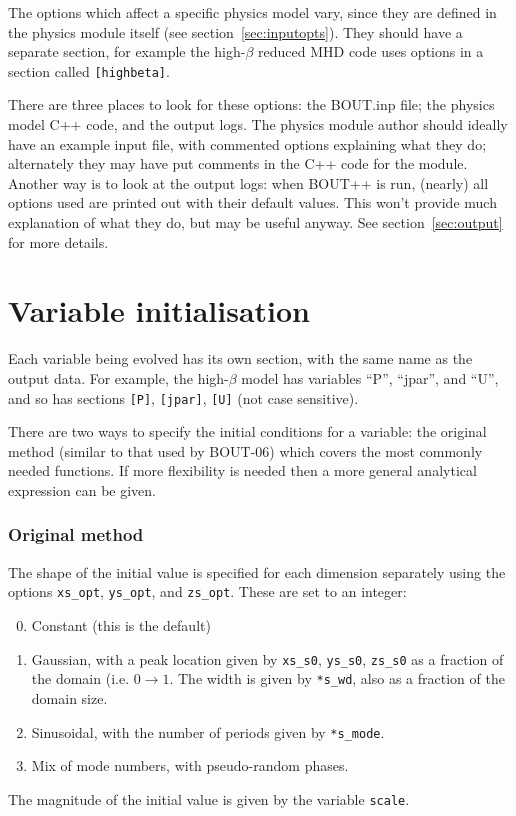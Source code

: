 \documentclass[12pt]{article}
\newcommand{\code}[1]{\texttt{#1}}
\begin{document}
The options which affect a specific physics model vary, since they are defined in the physics module itself
(see section~\ref{sec:inputopts}). They should have a separate section, for example the high-$\beta$
reduced MHD code uses options in a section called \code{[highbeta]}.

There are three places to look for these options: the BOUT.inp file; the physics model C++ code, and
the output logs. The physics module author should ideally have an example input file, with commented options
explaining what they do; alternately they may have put comments in the C++ code for the module.
Another way is to look at the output logs: when BOUT++ is run, (nearly) all options used are printed
out with their default values. This won't provide much explanation of what they do, but may be useful anyway.
See section~\ref{sec:output} for more details.

\section{Variable initialisation}
Each variable being evolved has its own section, with the same name as the
output data. For example, the high-$\beta$ model has variables ``P'',
``jpar'', and ``U'', and so has sections \code{[P]}, \code{[jpar]},
\code{[U]} (not case sensitive).

There are two ways to specify the initial conditions for a variable:
the original method (similar to that used by BOUT-06) which covers
the most commonly needed functions. If more flexibility is needed then
a more general analytical expression can be given.

\subsubsection{Original method}

The shape of the initial value is specified for each dimension separately
using the options \code{xs\_opt}, \code{ys\_opt}, and \code{zs\_opt}. These
are set to an integer:
\begin{enumerate}
\setcounter{enumi}{-1}
\item Constant (this is the default)
\item Gaussian, with a peak location given by \code{xs\_s0}, \code{ys\_s0},
  \code{zs\_s0} as a fraction of the domain (i.e. $0 \rightarrow 1$.
  The width is given by \code{*s\_wd}, also as a fraction of the domain size.
\item Sinusoidal, with the number of periods given by \code{*s\_mode}.
\item Mix of mode numbers, with pseudo-random phases.
\end{enumerate}
The magnitude of the initial value is given by the variable \code{scale}.
\end{document}
